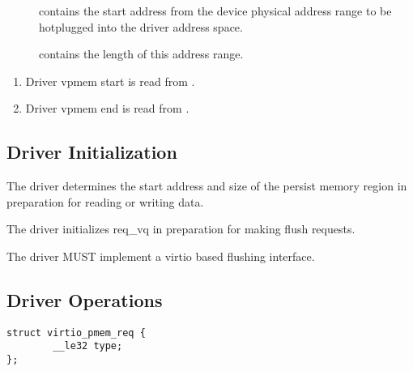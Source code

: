 \begin{description}
\item[] contains the start address from the device physical address range
to be hotplugged into the driver address space.

\item[] contains the length of this address range.
\end{description}

\begin{enumerate}
\item Driver vpmem start is read from .
\item Driver vpmem end is read from .
\end{enumerate}

\subsection{Driver Initialization}\label{sec:Device Types / PMEM Driver / Driver Initialization}

The driver determines the start address and size of the persist memory region in preparation for reading or writing data.

The driver initializes req_vq in preparation for making flush requests.


The driver MUST implement a virtio based flushing interface.

\subsection{Driver Operations}\label{sec:Device Types / PMEM Driver / Driver Operation}

\begin{lstlisting}
struct virtio_pmem_req {
        __le32 type;
};
\end{lstlisting}


